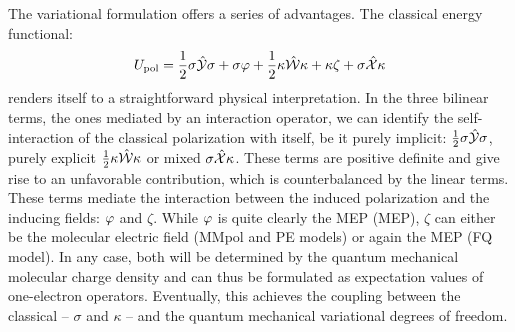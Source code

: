 The variational formulation offers a series of advantages.
The classical energy functional:
\begin{equation}
  U_\mathrm{pol} =
   \frac{1}{2}\sigma\hat{\mathcal{Y}}\sigma + \sigma\varphi
 + \frac{1}{2}\kappa\hat{\mathcal{W}}\kappa + \kappa\zeta
 + \sigma\hat{\mathcal{X}}\kappa
\end{equation}
renders itself to a straightforward physical interpretation. In the
three bilinear terms, \ie{} the ones mediated by an interaction
operator, we can identify the self-interaction of the classical
polarization with itself, be it purely implicit:
$\frac{1}{2}\sigma\hat{\mathcal{Y}}\sigma$, purely explicit
$\frac{1}{2}\kappa\hat{\mathcal{W}}\kappa$ or mixed $\sigma\hat{\mathcal{X}}\kappa$.
These terms are positive definite and give rise to an unfavorable
contribution, which is counterbalanced by the linear terms. These terms
mediate the interaction between the induced polarization and the
inducing fields: $\varphi$ and $\zeta$. While $\varphi$ is quite clearly the
\acl{MEP} (\acs{MEP}), $\zeta$ can either be the molecular electric
field (MMpol and PE models) or again the \acs{MEP} (FQ model).
In any case, both will be determined by the quantum mechanical molecular
charge density and can thus be formulated as expectation values of
one-electron operators. Eventually, this achieves the coupling between
the classical -- $\sigma$ and $\kappa$ -- and
the quantum mechanical variational degrees of freedom.

